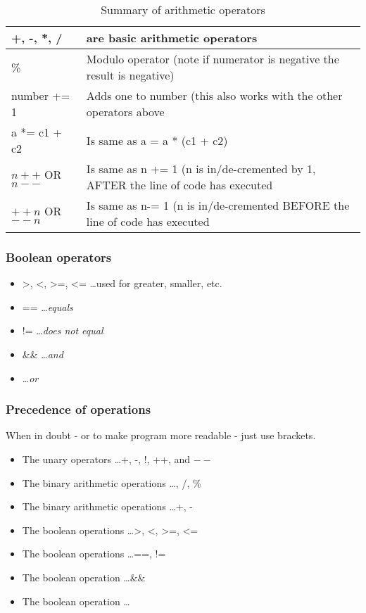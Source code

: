 \begin{table}[h]
\begin{center}
\renewcommand{\arraystretch}{1.8}
\begin{tabular}{ m{4cm} m{11cm}} 
\hline
 +, -, *, / & are basic arithmetic operators \\ 
\hline
\% & Modulo operator (note if numerator is negative the result is negative) \\  
 \hline
 number += 1 & Adds one to number (this also works with the other operators above\\
\hline
a *= c1 + c2 & Is same as a = a * (c1 + c2)\\
\hline
$n++$ OR $n--$ & Is same as n += 1 (n is in/de-cremented by 1, AFTER the line of code has executed\\
\hline
$++n$ OR $--n$ & Is same as n-= 1 (n is in/de-cremented BEFORE the line of code has executed\\
\hline
\end{tabular}
\end{center}
\caption{Summary of arithmetic operators}
\label{table_1}
\end{table}


\subsubsection*{Boolean operators}
\begin{itemize}
	\item \textgreater, \textless, \textgreater=, \textless= \ldots used for greater, smaller, etc.
	\item == \ldots \emph{equals}
	\item != \ldots \emph{does not equal}
	\item \&\& \ldots \emph{and}
	\item \textpipe \textpipe \ldots \emph{or}	 
\end{itemize}


\subsubsection*{Precedence of operations}
When in doubt - or to make program more readable - just use brackets.
\begin{itemize}
	\item The unary operators \ldots +, -, !, ++, and $--$
	\item The binary arithmetic operations \ldots *, /, \%
	\item The binary arithmetic operations \ldots +, -
	\item The boolean operations \ldots \textgreater, \textless, \textgreater=, \textless=
	\item The boolean operations \ldots ==, !=
	\item The boolean operation \ldots \&\&		
	\item The boolean operation \ldots \textpipe \textpipe
\end{itemize}















